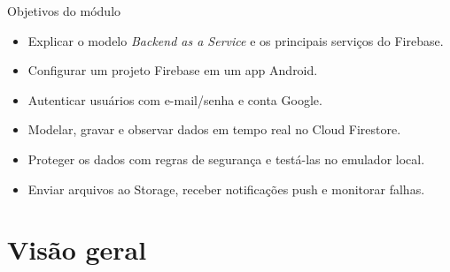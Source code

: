 \documentclass[aspectratio=169,10pt]{beamer}
\begin{document}
\capa

\begin{frame}{Objetivos do módulo}
  \begin{conceito}
    \begin{itemize}
      \item Explicar o modelo \emph{Backend as a Service} e os principais serviços do Firebase.
      \item Configurar um projeto Firebase em um app Android.
      \item Autenticar usuários com e-mail/senha e conta Google.
      \item Modelar, gravar e observar dados em tempo real no Cloud Firestore.
      \item Proteger os dados com regras de segurança e testá-las no emulador local.
      \item Enviar arquivos ao Storage, receber notificações push e monitorar falhas.
    \end{itemize}
  \end{conceito}
\end{frame}

\sumario



\section{Visão geral}
\end{document}
